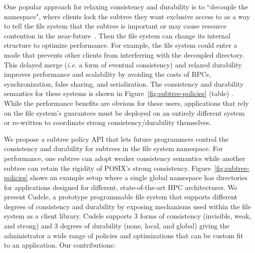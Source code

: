 One popular approach for relaxing consistency and durability is to ``decouple
the namespace", where clients lock the subtree they want exclusive access to as
a way to tell the file system that the subtree is important or may cause
resource contention in the near-future~\cite{grider:pdsw2015-marfs,
zheng:pdsw2015-deltafs, zheng:pdsw2014-batchfs, ren:sc2014-indexfs,
bent:slides-twotiers}. Then the file system can change its internal structure
to optimize performance. For example, the file system could enter a mode that
prevents other clients from interferring with the decoupled directory.  This
delayed merge ({\it i.e.} a form of eventual consistency) and relaxed
durability improves performance and scalability by avoiding the costs of RPCs,
synchronization, false sharing, and serialization.  The consistency and
durability semantics for these systems is shown in
Figure~\ref{fig:subtree-policies} (table) . While the performance benefits are obvious
for these users, applications that rely on the file system's guarantees must be
deployed on an entirely different system or re-written to coordinate strong
consistency/durability themselves.

%

We propose a subtree policy API that lets future programmers control
the consistency and durability for subtrees in the file system namespace. For performance, one
subtree can adopt weaker consistency semantics while another subtree can retain
the rigidity of POSIX's strong consistency. Figure~\ref{fig:subtree-policies}
shows an example setup where a single global namespace has directories for
applications designed for different, state-of-the-art HPC architectures.  We
present Cudele, a prototype programmable file system that supports different
degrees of consistency and durability by exposing mechanisms used within the
file system as a client library.  Cudele supports 3 forms of consistency
(invisible, weak, and strong) and 3 degrees of durability (none, local, and
global) giving the administrator a wide range of policies and optimizations
that can be custom fit to an application. Our contributions: 

